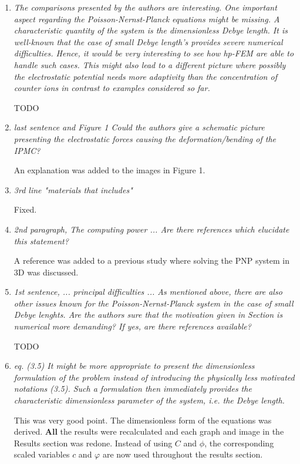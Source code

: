 \documentclass[mathpazo]{cicp}
\begin{document}
\begin{enumerate}
\item \emph{The comparisons presented by the authors are interesting. One important aspect regarding the
Poisson-Nernst-Planck equations might be missing. A characteristic quantity of the system is the
dimensionless Debye length. It is well-known that the case of small Debye length’s provides severe
numerical difficulties. Hence, it would be very interesting to see how hp-FEM are able to handle
such cases. This might also lead to a different picture where possibly the electrostatic potential
needs more adaptivity than the concentration of counter ions in contrast to examples considered so
far.}

TODO
\item \emph{last sentence and Figure 1 Could the authors give a schematic picture presenting the electrostatic forces causing the deformation/bending of the IPMC?}

An explanation was added to the images in Figure 1.

\item \emph{3rd line "materials that includes"}

Fixed.

\item \emph{2nd paragraph, The computing power ... Are there references which elucidate this statement?}

A reference was added to a previous study where solving the PNP system in 3D was discussed.

\item \emph{1st sentence, ... principal difficulties ... As mentioned above, there are also other issues
known for the Poisson-Nernst-Planck system in the case of small Debye lenghts. Are the
authors sure that the motivation given in Section is numerical more demanding? If yes, are
there references available?}

TODO

\item \emph{eq. (3.5) It might be more appropriate to present the dimensionless formulation of the problem instead of introducing the physically less motivated notations (3.5). Such a formulation then
immediately provides the characteristic dimensionless parameter of the system, i.e. the Debye
length.}

This was very good point. The dimensionless form of the equations was derived. $\mathbf{All}$ the
results were recalculated and each graph and image in the Results section was redone.
Instead of using $C$
and $\phi$, the corresponding scaled variables $c$ and $\varphi$ are now used throughout the results section.


\end{enumerate}
\end{document}
